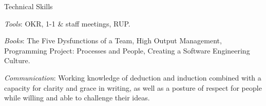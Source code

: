 \begin{rubric}{Technical Skills}{

  \entry* \emph{Tools}: OKR, 1-1 \& staff meetings, RUP.

  \entry* \emph{Books}: The Five Dysfunctions of a Team, High Output Management, Programming Project: Processes and People, Creating a Software Engineering Culture.

  \entry* \emph{Communication}: Working knowledge of deduction and
induction combined with a capacity for clarity and grace in writing,
as well as a posture of respect for people while willing and able to
challenge their ideas.


}\end{rubric}
